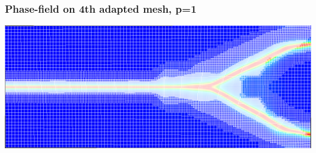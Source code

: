 \documentclass{beamer}
\begin{document}
\begin{frame}
  \frametitle{Phase-field on 4th adapted mesh, p=1}

  \begin{center}
    \includegraphics[width=\textwidth]{figs/Rectangle-A4-p1}
  \end{center}
\end{frame}

\end{document}
